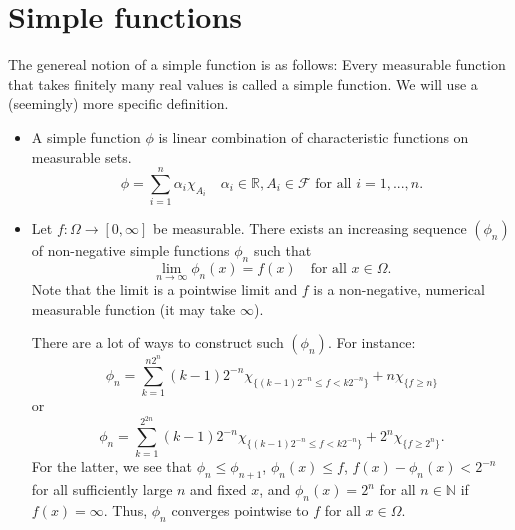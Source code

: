 \documentclass[a4paper, 11pt]{article}
\theoremstyle{plain}
\theoremstyle{definition}
\begin{document}
\section{Simple functions}
The genereal notion of a simple function is as follows: Every measurable function that takes finitely many real values is called a simple function. We will use a (seemingly) more specific definition.

\begin{itemize}
	\item A simple function $\phi$ is linear combination of characteristic functions on measurable sets.
	\[
		\phi = \sum^n_{i=1} \alpha_i \chi_{A_i} \quad \alpha_i \in \mathbb R, A_i \in \mathcal F \text{ for all $i =1,...,n$}.
	\]
	
	\item Let $f: \Omega \to [0, \infty]$ be measurable. There exists an increasing sequence $(\phi_n)$ of non-negative simple functions $\phi_n$ such that
	\[
		\lim_{n \to \infty}\phi_n(x) = f(x) \quad \text{for all $x \in \Omega$}.
	\]
	Note that the limit is a pointwise limit and $f$ is a non-negative, numerical measurable function (it may take $\infty$). 
	
	There are a lot of ways to construct such $(\phi_n)$. For instance:
	\[
		\phi_n = \sum^{n2^n}_{k=1}(k-1)2^{-n}\chi_{\{ (k-1)2^{-n} \leq f < k2^{-n} \}} + n\chi_{\{ f \geq n \}}
	\]
	or 
	\[
		\phi_n = \sum^{2^{2n}}_{k=1}(k-1)2^{-n}\chi_{\{ (k-1)2^{-n} \leq f <k2^{-n} \}} + 2^n\chi_{\{ f \geq 2^n \}}.
	\]
	For the latter, we see that $\phi_n \leq \phi_{n+1}$, $\phi_n(x) \leq f$, $f(x) - \phi_n(x)< 2^{-n}$ for all sufficiently large $n$ and fixed $x$, and $\phi_n(x) = 2^n$ for all $n \in \mathbb N$ if $f(x) = \infty$. Thus, $\phi_n$ converges pointwise to $f$ for all $x \in \Omega$.
\end{itemize}
\end{document}
